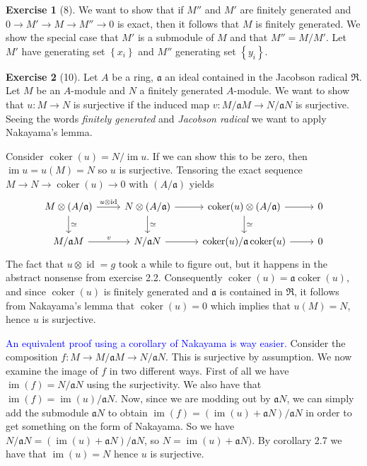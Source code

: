 \documentclass{article}
\theoremstyle{definition}
\newtheorem*{exercise}{Exercise}
\DeclareMathOperator{\im}{im}
\DeclareMathOperator{\id}{id}
\DeclareMathOperator{\coker}{coker}
\renewcommand{\a}{\mathfrak{a}}
\begin{document}
\begin{exercise}[8]
    We want to show that if $M''$ and $M'$ are finitely generated and $0 \to M'
    \to M \to M'' \to 0$ is exact, then it follows that $M$ is finitely
    generated. We show the special case that $M'$ is a submodule of $M$ and
    that $M'' = M / M'$. Let $M'$ have generating set $\left\{ x_i \right\}$
    and $M''$ generating set $\left\{ y_i \right\}$.
\end{exercise}

\begin{exercise}[10]
    Let $A$ be a ring, $\mathfrak{a}$ an ideal contained in the Jacobson
    radical $\mathfrak{R}$. Let $M$ be an $A$-module and $N$ a finitely
    generated $A$-module. We want to show that $u \colon M \to N$ is
    surjective if the induced map $v \colon M /\mathfrak{a}M \to N
    /\mathfrak{a}N$ is surjective. Seeing the words \emph{finitely
    generated} and \emph{Jacobson radical} we want to apply Nakayama's
    lemma.
    
    Consider $\coker(u) = N / \im{u}$. If we can show this to be zero,
    then $\im{u} = u(M) = N$ so $u$ is surjective. Tensoring the exact
    sequence $M \to N \to \coker(u) \to 0$ with $(A/\mathfrak{a})$ yields
    \begin{equation}
        \notag
        \begin{tikzcd}
            M \otimes (A / \mathfrak{a}) \ar[r, "u\otimes \id"] \ar[d, "\simeq"] & N \otimes (A / \mathfrak{a}) \ar[r]  \ar[d, "\simeq"]& \coker(u) \otimes (A / \mathfrak{a}) \ar[r] \ar[d, "\simeq"] & 0 \\
            M / \mathfrak{a}M \ar[r, "v"] & N / \mathfrak{a}N \ar[r] & \coker(u) / \mathfrak{a}\coker(u) \ar[r] & 0
        \end{tikzcd}
    \end{equation}
    The fact that $u\otimes \id = g$ took a while to figure out, but it
    happens in the abstract nonsense from exercise 2.2. Consequently
    $\coker(u) = \mathfrak{a}\coker(u)$, and since $\coker(u)$ is finitely
    generated and $\mathfrak{a}$ is contained in $\mathfrak{R}$, it
    follows from Nakayama's lemma that $\coker(u) = 0$ which implies that
    $u(M) = N$, hence $u$ is surjective.

    \textcolor{blue}{An equivalent proof using a corollary of Nakayama is way
    easier.} Consider the composition $f\colon M \to M/\mathfrak{a}M \to
    N/\mathfrak{a}N$. This is surjective by assumption. We now examine the
    image of $f$ in two different ways. First of all we have $\im(f) = N / \a
    N$ using the surjectivity. We also have that $\im(f) = \im(u)/\a N$. Now,
    since we are modding out by $\a N$, we can simply add the submodule $\a N$
    to obtain $\im(f) = (\im(u) + \a N) / \a N$ in order to get something on
    the form of Nakayama. So we have $N / \a N = (\im(u) + \a N) / \a N$, so $N
    = \im(u) + \a N)$. By corollary 2.7 we have that $\im(u) = N$ hence $u$ is
    surjective.
\end{exercise}
\end{document}
